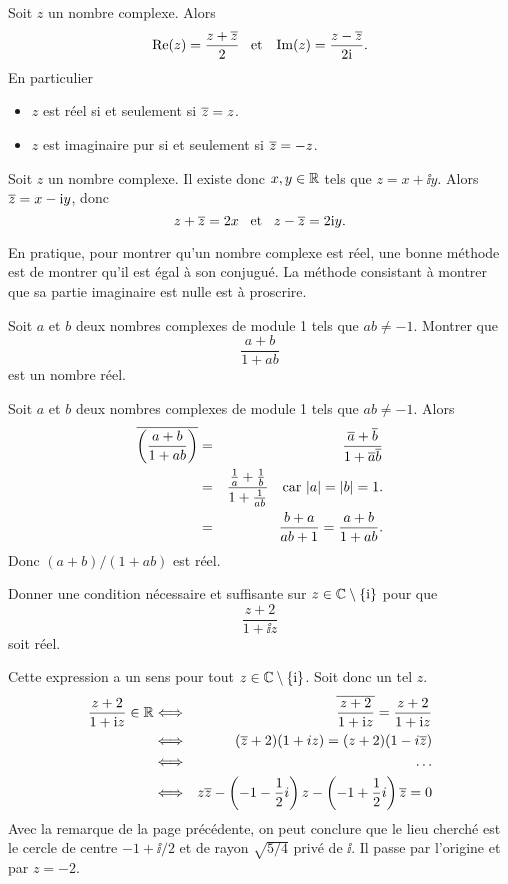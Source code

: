 \documentclass{magnoliaold}
\begin{document}
\begin{proposition}[utile=-3]
Soit $z$ un nombre complexe. Alors
\[\mathop{\rm Re}(z)=\frac{z+\overline{z}}{2} \quad\!\text{et}\quad\!
  \mathop{\rm Im}(z)=\frac{z-\overline{z}}{2{\rm i}}.\]
En particulier
\begin{itemize}
\item $z$ est réel si et seulement si $\overline{z}=z$.
\item $z$ est imaginaire pur si et seulement si $\overline{z}=-z$.
\end{itemize}
\end{proposition}
\begin{preuve}
Soit $z$ un nombre complexe. Il existe donc $x,y\in\mathbb{R}$ tels que $z=x+\ii y$. Alors $\overline{z}=x-{\rm i} y$, donc
\[z+\overline{z}=2x \quad\!\text{et}\quad\! z-\overline{z}=2{\rm i} y.\]
\end{preuve}

\begin{remarqueUnique}
\remarque En pratique, pour montrer qu'un nombre complexe est réel, une
  bonne méthode est de montrer qu'il est égal à son conjugué. La méthode
  consistant à montrer que sa partie imaginaire est nulle est à proscrire.
\end{remarqueUnique}

\begin{exos}
\exo Soit $a$ et $b$ deux nombres complexes de module 1 tels que $ab\neq -1$. Montrer que
  \[\frac{a+b}{1+ab}\]
  est un nombre réel.
\begin{sol}
Soit $a$ et $b$ deux nombres complexes de module 1 tels que $ab\neq -1$. Alors
\begin{eqnarray*}
\overline{\left(\frac{a+b}{1+ab}\right)}
&=& \frac{\overline{a}+\overline{b}}{1+\overline{a}\overline{b}}\\
&=& \frac{\frac{1}{a}+\frac{1}{b}}{1+\frac{1}{ab}} \quad \text{car $\left|a\right|=\left|b\right|=1$.}\\
&=& \frac{b+a}{ab+1} = \frac{a+b}{1+ab}.
\end{eqnarray*}
Donc $(a+b)/(1+ab)$ est réel.
\end{sol}
\exo Donner une condition nécessaire et suffisante sur $z\in\mathbb{C}\setminus\left\{{\rm i}\right\}$ pour que
  \[\frac{z+2}{1+\ii z}\]
  soit réel.
  \begin{sol}
Cette expression a un sens pour tout $z\in\mathbb{C}\setminus\left\{{\rm i}\right\}$. Soit donc un tel $z$.
\begin{eqnarray*}
 \frac{z+2}{1+{\rm i} z} \in \mathbb{R}&\Longleftrightarrow &\overline{\frac{z+2}{1+{\rm i} z}}=\frac{z+2}{1+{\rm i} z}\\
 &\Longleftrightarrow & (\overline{z}+2)(1+iz)=(z+2)(1-i\overline{z})\\
 &\Longleftrightarrow & \ldots \\
 &\Longleftrightarrow & z\overline{z}-\left(-1-\frac{1}{2}i\right)z-\left(-1+\frac{1}{2}i\right)\overline{z}=0 
 \end{eqnarray*}
Avec la remarque de la page précédente, on peut conclure que le lieu cherché est le cercle de centre $-1+\ii/2$ et de rayon $\sqrt{5/4}$ privé de $\ii$. Il passe par l'origine et par $z=-2$. 
  \end{sol}
\end{exos}
\end{document}
